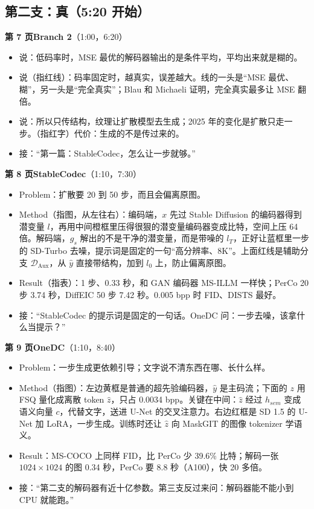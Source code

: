 \subsection*{\textcolor{accent}{第二支：真}（5:20 开始）}

\textbf{第 7 页\quad Branch 2}（1:00，6:20）
\begin{itemize}
  \item 说：低码率时，MSE 最优的解码器输出的是条件平均，平均出来就是糊的。
  \item 说（指红线）：码率固定时，越真实，误差越大。线的一头是“MSE 最优、糊”，另一头是“完全真实”；Blau 和 Michaeli 证明，完全真实最多让 MSE 翻倍。
  \item 说：所以只传结构，纹理让扩散模型去生成；2025 年的变化是扩散只走一步。（指红字）代价：生成的不是传过来的。
  \item 接：“第一篇：StableCodec，怎么让一步就够。”
\end{itemize}

\textbf{第 8 页\quad StableCodec}（1:10，7:30）
\begin{itemize}
  \item Problem：扩散要 20 到 50 步，而且会偏离原图。
  \item Method（指图，从左往右）：编码端，$x$ 先过 Stable Diffusion 的编码器得到潜变量 $l$，再用中间橙框里压得很狠的潜变量编码器变成比特，空间上压 64 倍。解码端，$g_s$ 解出的不是干净的潜变量，而是带噪的 $l_T$，正好让蓝框里一步的 SD-Turbo 去噪，提示词是固定的一句“高分辨率、8K”。上面红线是辅助分支 $\mathcal D_{\mathrm{Aux}}$，从 $\hat y$ 直接带结构，加到 $l_0$ 上，防止偏离原图。
  \item Result（指表）：1 步、0.33 秒，和 GAN 编码器 MS-ILLM 一样快；PerCo 20 步 3.74 秒，DiffEIC 50 步 7.42 秒。0.005 bpp 时 FID、DISTS 最好。
  \item 接：“StableCodec 的提示词是固定的一句话。OneDC 问：一步去噪，该拿什么当提示？”
\end{itemize}

\textbf{第 9 页\quad OneDC}（1:10，8:40）
\begin{itemize}
  \item Problem：一步生成更依赖引导；文字说不清东西在哪、长什么样。
  \item Method（指图）：左边黄框是普通的超先验编码器，$\hat y$ 是主码流；下面的 $z$ 用 FSQ 量化成离散 token $\hat z$，只占 0.0034 bpp。关键在中间：$\hat z$ 经过 $h_{sem}$ 变成语义向量 $c$，代替文字，送进 U-Net 的交叉注意力。右边红框是 SD 1.5 的 U-Net 加 LoRA，一步生成。训练时还让 $\hat z$ 向 MaskGIT 的图像 tokenizer 学语义。
  \item Result：MS-COCO 上同样 FID，比 PerCo 少 39.6\% 比特；解码一张 $1024\times1024$ 的图 0.34 秒，PerCo 要 8.8 秒（A100），快 20 多倍。
  \item 接：“第二支的解码器有近十亿参数。第三支反过来问：解码器能不能小到 CPU 就能跑。”
\end{itemize}

